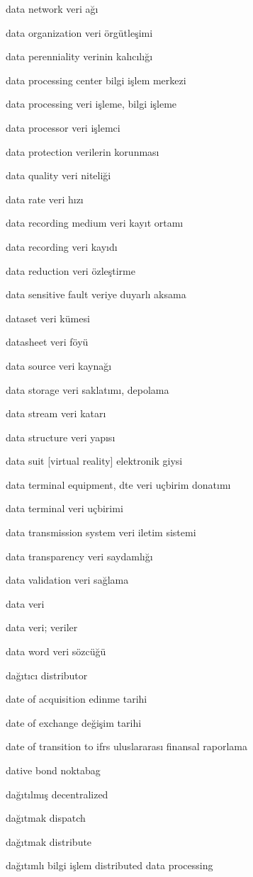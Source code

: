 \documentclass[12pt,fleqn]{article}\usepackage{../../common}
\begin{document}
data network veri ağı

data organization veri örgütleşimi

data perenniality verinin kalıcılığı

data processing center bilgi işlem merkezi

data processing veri işleme, bilgi işleme

data processor veri işlemci

data protection verilerin korunması

data quality veri niteliği

data rate veri hızı

data recording medium veri kayıt ortamı

data recording veri kayıdı

data reduction veri özleştirme

data sensitive fault veriye duyarlı aksama

dataset veri kümesi

datasheet veri föyü

data source veri kaynağı

data storage veri saklatımı, depolama

data stream veri katarı

data structure veri yapısı

data suit [virtual reality] elektronik giysi

data terminal equipment, dte veri uçbirim donatımı

data terminal veri uçbirimi

data transmission system veri iletim sistemi

data transparency veri saydamlığı

data validation veri sağlama

data veri

data veri; veriler

data word veri sözcüğü

dağıtıcı distributor

date of acquisition edinme tarihi

date of exchange değişim tarihi

date of transition to ifrs uluslararası finansal raporlama

dative bond noktabag

dağıtılmış decentralized

dağıtmak dispatch

dağıtmak distribute

dağıtımlı bilgi işlem distributed data processing
\end{document}
